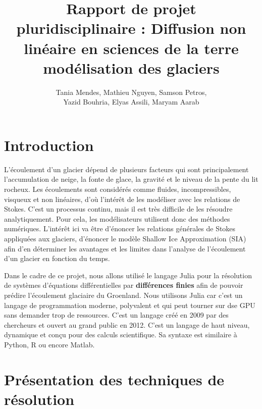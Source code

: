 \documentclass{article}
\title{\vspace{\fill}\textbf{ Rapport de projet pluridisciplinaire :} \newline Diffusion non linéaire en sciences de la terre modélisation des glaciers\vspace{\fill}}
\author{Tania Mendes, Mathieu Nguyen, Samson Petros,\\ Yazid Bouhria, Elyas Assili, Maryam Aarab}
\affil{\textbf{Encadrante} : Laetitia Le Pourhiet}
\begin{document}
\maketitle 

\newpage

\tableofcontents

\newpage
\section*{Introduction}

L’écoulement d’un glacier dépend de plusieurs facteurs qui sont principalement l’accumulation de neige, la fonte de glace, la gravité et le niveau de la pente du lit rocheux.
Les écoulements sont considérés comme fluides, incompressibles, visqueux et non linéaires, d’où l’intérêt de les modéliser avec les relations de Stokes.
\newline
C'est un processus continu, mais il est très difficile de les résoudre analytiquement. Pour cela, les modélisateurs utilisent donc des méthodes numériques.
L’intérêt ici va être d’énoncer les relations générales de Stokes appliquées aux glaciers, d’énoncer le modèle Shallow Ice Approximation (SIA) afin d’en déterminer les avantages et les limites dans l’analyse de l’écoulement d’un glacier en fonction du temps.


Dans le cadre de ce projet, nous allons utilisé le langage Julia pour la résolution de systèmes d'équations différentielles par \textbf{différences finies} afin de pouvoir prédire l'écoulement glaciaire du Groenland. Nous utilisons Julia car c'est un langage de programmation moderne, polyvalent et qui peut tourner sur dse GPU sans demander trop de ressources. C'est un langage créé en 2009 par des chercheurs et ouvert au grand public en 2012. C'est un langage de haut niveau, dynamique et conçu pour des calculs scientifique. Sa syntaxe est similaire à Python, R ou encore Matlab.


\section{Présentation des techniques de résolution}
\end{document}
